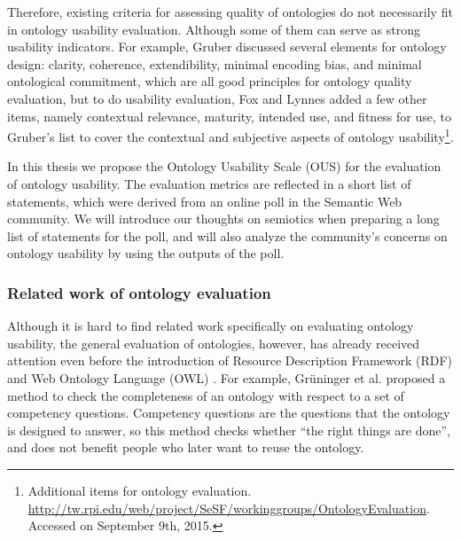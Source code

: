 Therefore, existing criteria for assessing quality of ontologies do not necessarily fit in ontology usability evaluation. Although some of them can serve as strong usability indicators. For example, Gruber \cite{gruber1995toward}
discussed several elements for ontology design: clarity, coherence, extendibility, minimal encoding bias, and minimal ontological commitment, which are all good principles for ontology quality evaluation, but to do usability evaluation, Fox and Lynnes added a few other items, namely contextual relevance, maturity, intended use, and fitness for use, to Gruber's list to cover the contextual and subjective aspects of ontology usability\footnote{Additional items for ontology evaluation. \url{http://tw.rpi.edu/web/project/SeSF/workinggroups/OntologyEvaluation}. Accessed on September 9th, 2015.}.

In this thesis we propose the Ontology Usability Scale (OUS) for the evaluation of ontology usability. The evaluation metrics are reflected in a short list of statements, which were derived from an online poll in the Semantic Web community. We will introduce our thoughts on semiotics when preparing a long list of statements for the poll, and will also analyze the community's concerns on ontology usability by using the outputs of the poll.

\subsubsection{Related work of ontology evaluation}
Although it is hard to find related work specifically on evaluating ontology usability, the general evaluation of ontologies, however, has already received attention even before the introduction of Resource Description Framework (RDF) \cite{brickley2000resource} and Web Ontology Language (OWL) \cite{mcguinness2004owl}. For example, Gr{\"u}ninger et al. \cite{gruninger1995methodology} proposed a method to check the completeness of an ontology with respect to a set of competency questions. Competency questions are the questions that the ontology is designed to answer, so this method checks whether ``the right things are done'', and does not benefit people who later want to reuse the ontology.


